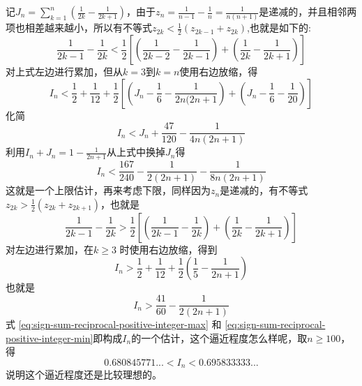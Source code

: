 记$J_n=\sum_{k=1}^n(\frac{1}{2k}-\frac{1}{2k+1})$，由于$z_n=\frac{1}{n-1}-\frac{1}{n}=\frac{1}{n(n+1)}$是递减的，并且相邻两项也相差越来越小，所以有不等式$z_{2k}<\frac{1}{2}(z_{2k-1}+z_{2k})$,也就是如下的:
\begin{equation*}
  \frac{1}{2k-1} - \frac{1}{2k} < \frac{1}{2} \left[ \left( \frac{1}{2k-2} - \frac{1}{2k-1} \right) + \left( \frac{1}{2k} - \frac{1}{2k+1} \right) \right]
\end{equation*}
对上式左边进行累加，但从$k=3$到$k=n$使用右边放缩，得
\begin{equation*}
  I_n<\frac{1}{2}+\frac{1}{12}+\frac{1}{2} \left[ \left( J_n-\frac{1}{6}-\frac{1}{2n(2n+1} \right) + \left( J_n-\frac{1}{6}-\frac{1}{20} \right) \right]
\end{equation*}
化简
\begin{equation*}
 I_n<J_n+\frac{47}{120} - \frac{1}{4n(2n+1)}
\end{equation*}
利用$I_n+J_n=1-\frac{1}{2n+1}$从上式中换掉$J_n$得
\begin{equation}
  \label{eq:sign-sum-reciprocal-positive-integer-max}
  I_n<\frac{167}{240}-\frac{1}{2(2n+1)}-\frac{1}{8n(2n+1)}
\end{equation}
这就是一个上限估计，再来考虑下限，同样因为$z_n$是递减的，有不等式$z_{2k}>\frac{1}{2}(z_{2k}+z_{2k+1})$，也就是
\begin{equation*}
  \frac{1}{2k-1} - \frac{1}{2k} > \frac{1}{2} \left[ \left( \frac{1}{2k-1} - \frac{1}{2k} \right) + \left( \frac{1}{2k} - \frac{1}{2k+1} \right) \right]
\end{equation*}
对左边进行累加，在$k \geqslant 3$ 时使用右边放缩，得到
\begin{equation*}
  I_n > \frac{1}{2} + \frac{1}{12} + \frac{1}{2} \left( \frac{1}{5} - \frac{1}{2n+1} \right)
\end{equation*}
也就是
\begin{equation}
  \label{eq:sign-sum-reciprocal-positive-integer-min}
 I_n > \frac{41}{60} -\frac{1}{2(2n+1)} 
\end{equation}
式 \ref{eq:sign-sum-reciprocal-positive-integer-max} 和 \ref{eq:sign-sum-reciprocal-positive-integer-min}即构成$I_n$的一个估计，这个逼近程度怎么样呢，取$n \geqslant 100$，得
\begin{equation*}
  0.680845771... < I_n < 0.695833333...
\end{equation*}
说明这个逼近程度还是比较理想的。

